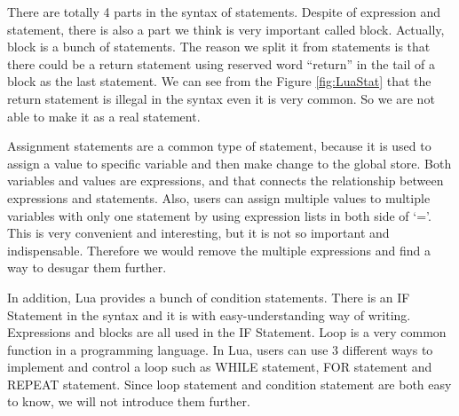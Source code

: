 There are totally 4 parts in the syntax of statements. Despite of expression and statement, there is also a part we think is very important called block. Actually, block is a bunch of statements. The reason we split it from statements is that there could be a return statement using reserved word ``return'' in the tail of a block as the last statement. We can see from the Figure \ref{fig:LuaStat} that the return statement is illegal in the syntax even it is very common. So we are not able to make it as a real statement.

Assignment statements are a common type of statement, because it is used to assign a value to specific variable and then make change to the global store. Both variables and values are expressions, and that connects the relationship between expressions and statements. Also, users can assign multiple values to multiple variables with only one statement by using expression lists in both side of `='. This is very convenient and interesting, but it is not so important and indispensable. Therefore we would remove the multiple expressions and find a way to desugar them further. 

In addition, Lua provides a bunch of condition statements. There is an IF Statement in the syntax and it is with easy-understanding way of writing. Expressions and blocks are all used in the IF Statement. Loop is a very common function in a programming language. In Lua, users can use 3 different ways to implement and control a loop such as WHILE statement, FOR statement and REPEAT statement. Since loop statement and condition statement are both easy to know, we will not introduce them further.

\newcommand{\assign}[2]{{\overline{#1_i}}~{=}~{\overline{#2_j}}}
\newcommand{\doe}[1]{\mbox{\tt do}~#1~{\tt end}}
\newcommand{\ife}[3]{\mbox{\tt if}~{#1}~\mbox{\tt then}~{#2}~\mbox{\tt else}~{#3}~{\tt end}}
\newcommand{\whilee}[2]{\mbox{\tt while}~#1~{\tt do}~#2~{\tt end}}
\newcommand{\repeate}[2]{\mbox{\tt repeat}~#2~{\tt until}~#1~}
\newcommand{\for}[3]{\mbox{\tt for}~#1~=~#2_1,~#2_2,~#2_3~{\tt do}~#3~{\tt end}}
\newcommand{\function}[3]{\mbox{\tt function}~#1({\overline{#2_i}})~#3~{\tt end}}
\newcommand{\local}[2]{\mbox{\tt local}~{\assign #1 #2}}

